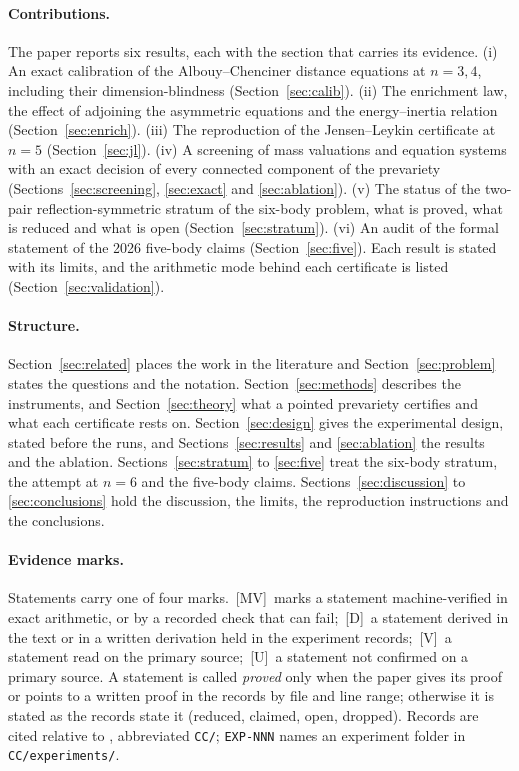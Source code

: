 \documentclass[11pt]{article}
\theoremstyle{definition}
\theoremstyle{remark}
\newcommand{\mk}[1]{\,{\scriptsize[#1]}}
\newcommand{\MV}{\mk{MV}}
\newcommand{\Dm}{\mk{D}}
\newcommand{\Vm}{\mk{V}}
\newcommand{\Um}{\mk{U}}
\begin{document}
\paragraph{Contributions.}
The paper reports six results, each with the section that carries its evidence. (i) An exact calibration of the
Albouy--Chenciner distance equations at $n=3,4$, including their dimension-blindness (Section~\ref{sec:calib}).
(ii) The enrichment law, the effect of adjoining the asymmetric equations and the energy--inertia relation
(Section~\ref{sec:enrich}). (iii) The reproduction of the Jensen--Leykin certificate at $n=5$
(Section~\ref{sec:jl}). (iv) A screening of mass valuations and equation systems with an exact decision of every
connected component of the prevariety (Sections~\ref{sec:screening}, \ref{sec:exact} and \ref{sec:ablation}).
(v) The status of the two-pair reflection-symmetric stratum of the six-body problem, what is proved, what is
reduced and what is open (Section~\ref{sec:stratum}). (vi) An audit of the formal statement of the 2026 five-body
claims (Section~\ref{sec:five}). Each result is stated with its limits, and the arithmetic mode behind each
certificate is listed (Section~\ref{sec:validation}).

\paragraph{Structure.}
Section~\ref{sec:related} places the work in the literature and Section~\ref{sec:problem} states the questions and the
notation. Section~\ref{sec:methods} describes the instruments, and Section~\ref{sec:theory} what a pointed prevariety
certifies and what each certificate rests on. Section~\ref{sec:design} gives the experimental design, stated before the
runs, and Sections~\ref{sec:results} and \ref{sec:ablation} the results and the ablation. Sections~\ref{sec:stratum}
to \ref{sec:five} treat the six-body stratum, the attempt at $n=6$ and the five-body claims. Sections~\ref{sec:discussion}
to \ref{sec:conclusions} hold the discussion, the limits, the reproduction instructions and the conclusions.

\paragraph{Evidence marks.}
Statements carry one of four marks. \MV\ marks a statement machine-verified in exact arithmetic,
or by a recorded check that can fail; \Dm\ a statement derived in the text or in a written
derivation held in the experiment records; \Vm\ a statement read on the primary source; \Um\ a
statement not confirmed on a primary source. A statement is called \emph{proved} only when the
paper gives its proof or points to a written proof in the records by file and line range;
otherwise it is stated as the records state it (reduced, claimed, open, dropped). Records are
cited relative to , abbreviated
\texttt{CC/}; \texttt{EXP-NNN} names an experiment folder in \texttt{CC/experiments/}.
\end{document}
